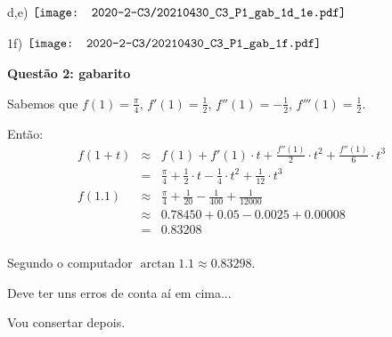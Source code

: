 \documentclass[oneside,12pt]{article}
\begin{document}
\msk

d,e)
\qquad
%
$\begin{matrix}
 \texttt{[image: 2020-2-C3/20210430\_C3\_P1\_gab\_1d\_1e.pdf]}
 \end{matrix}
$

\newpage

1f)
$\begin{matrix}
\texttt{[image: 2020-2-C3/20210430\_C3\_P1\_gab\_1f.pdf]}
 \end{matrix}
$




\newpage


{\bf Questão 2: gabarito}

Sabemos que $f(1) = \frac{π}{4}$, $f'(1) = \frac12$, $f''(1) = -\frac12$, $f'''(1) = \frac12$.

Então:
%
$$\begin{array}{rcl}
  f(1+t) &≈& f(1) + f'(1)·t + \frac{f''(1)}{2}·t^2 + \frac{f''(1)}{6}·t^3 \\
         &=& \frac{π}{4} + \frac{1}{2}·t - \frac{1}{4}·t^2 + \frac{1}{12}·t^3 \\
  f(1.1) &≈& \frac{π}{4} + \frac{1}{20}  - \frac{1}{400}   + \frac{1}{12000} \\
         &≈& 0.78450 + 0.05  - 0.0025   + 0.00008 \\
         &=& 0.83208 \\
  \end{array}
$$


Segundo o computador $\arctan 1.1 ≈ 0.83298$.

Deve ter uns erros de conta aí em cima...

Vou consertar depois.




\end{document}
